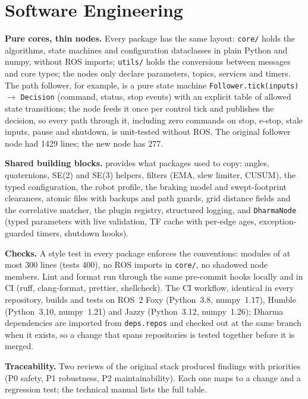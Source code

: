 \section{Software Engineering}
\label{sec:eng}

\textbf{Pure cores, thin nodes.} Every package has the same layout: \texttt{core/} holds the
algorithms, state machines and configuration dataclasses in plain Python and numpy, without
ROS imports; \texttt{utils/} holds the conversions between messages and core types; the nodes
only declare parameters, topics, services and timers. The path follower, for example, is a pure
state machine \texttt{Follower.tick(inputs)} $\to$ \texttt{Decision} (command, status, stop
events) with an explicit table of allowed state transitions; the node feeds it once per control
tick and publishes the decision, so every path through it, including zero commands on stop,
e-stop, stale inputs, pause and shutdown, is unit-tested without ROS. The original follower
node had 1429 lines; the new node has 277.

\textbf{Shared building blocks.}  provides what packages used to copy:
angles, quaternions, SE(2) and SE(3) helpers, filters (EMA, slew limiter, CUSUM), the typed
configuration, the robot profile, the braking model and swept-footprint clearances, atomic
files with backups and path guards, grid distance fields and the correlative matcher, the plugin
registry, structured logging, and \texttt{DharmaNode} (typed parameters with live validation,
TF cache with per-edge ages, exception-guarded timers, shutdown hooks).

\textbf{Checks.} A style test in every package enforces the conventions: modules of at most 300
lines (tests 400), no ROS imports in \texttt{core/}, no shadowed node members. Lint and format
run through the same pre-commit hooks locally and in CI (ruff, clang-format, prettier,
shellcheck). The CI workflow, identical in every repository, builds and tests on ROS~2 Foxy
(Python~3.8, numpy~1.17), Humble (Python~3.10, numpy~1.21) and Jazzy (Python~3.12, numpy~1.26);
Dharma dependencies are imported from \texttt{deps.repos} and checked out at the same branch when it exists, so a
change that spans repositories is tested together before it is merged.

\textbf{Traceability.} Two reviews of the original stack produced findings with priorities
(P0 safety, P1 robustness, P2 maintainability). Each one maps to a change and a regression test;
the technical manual lists the full table.


